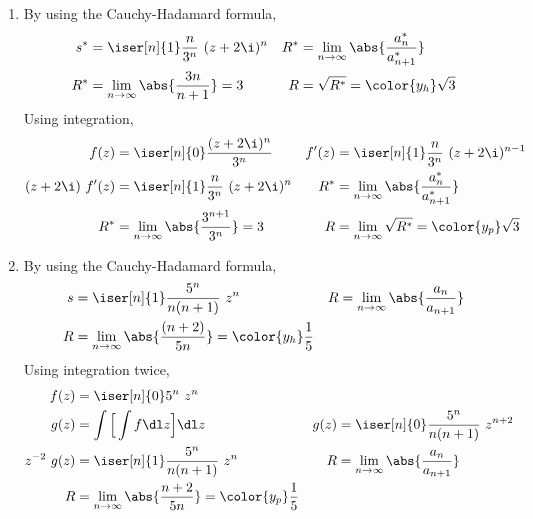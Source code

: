 \begin{enumerate}
    \item By using the Cauchy-Hadamard formula,
          \begin{align}
              s^* & = \iser[n]{1} \frac{n}{3^n}\ (z + 2\i)^n       &
              R^* & = \lim_{n \to \infty} \abs{\frac{a^*_n}
              {a^*_{n+1}}}                                           \\
              R^* & = \lim_{n \to \infty} \abs{\frac{3n}{n+1}} = 3 &
              R   & = \sqrt{R^*} = \color{y_h} \sqrt{3}
          \end{align}
          Using integration,
          \begin{align}
              f(z)           & = \iser[n]{0} \frac{(z + 2\i)^n}{3^n}               &
              f'(z)          & = \iser[n]{1} \frac{n}{3^n}\ (z + 2\i)^{n-1}          \\
              (z+2\i)\ f'(z) & = \iser[n]{1} \frac{n}{3^n}\ (z + 2\i)^{n}          &
              R^*            & = \lim_{n \to \infty} \abs{\frac{a^*_n}
              {a^*_{n+1}}}                                                           \\
              R^*            & = \lim_{n \to \infty} \abs{\frac{3^{n+1}}{3^n}} = 3 &
              R              & = \lim_{n \to \infty} \sqrt{R^*}
              = \color{y_p} \sqrt{3}
          \end{align}

    \item By using the Cauchy-Hadamard formula,
          \begin{align}
              s & = \iser[n]{1} \frac{5^n}{n(n+1)}\ z^n          &
              R & = \lim_{n \to \infty} \abs{\frac{a_n}
              {a_{n+1}}}                                           \\
              R & = \lim_{n \to \infty} \abs{\frac{(n+2)}{5n}} =
              \color{y_h} \frac{1}{5}
          \end{align}
          Using integration twice,
          \begin{align}
              f(z)         & = \iser[n]{0} 5^n\ z^n                       \\
              g(z)         & = \int \Big[\int f \dl z\Big] \dl z        &
              g(z)         & = \iser[n]{0} \frac{5^n}{n(n+1)}\ z^{n+2}    \\
              z^{-2}\ g(z) & = \iser[n]{1} \frac{5^n}{n(n+1)}\ z^n      &
              R            & = \lim_{n \to \infty} \abs{\frac{a_n}
              {a_{n+1}}}                                                  \\
              R            & = \lim_{n \to \infty} \abs{\frac{n+2}{5n}}
              = \color{y_p} \frac{1}{5}
          \end{align}


\end{enumerate}
